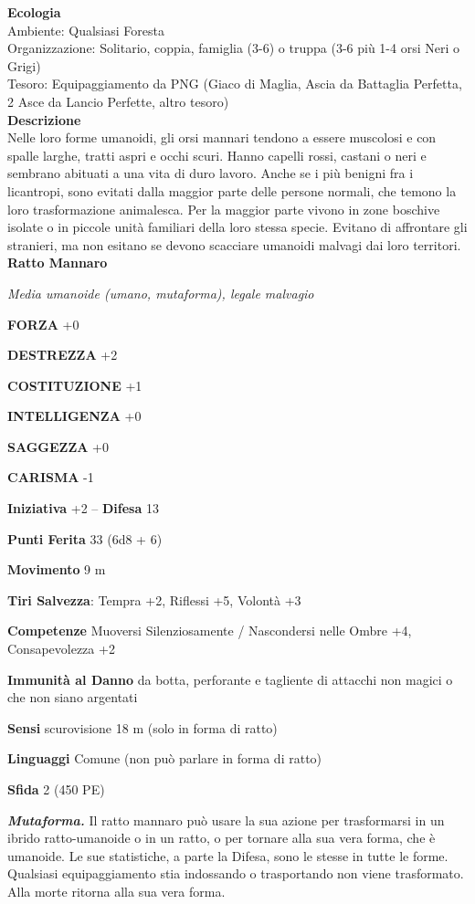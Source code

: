 \begin{multicols}{2}
\textbf{Ecologia}\\
Ambiente: Qualsiasi Foresta\\
Organizzazione: Solitario, coppia, famiglia (3-6) o truppa (3-6 più 1-4 orsi Neri o Grigi)\\
Tesoro: Equipaggiamento da PNG (Giaco di Maglia, Ascia da Battaglia Perfetta, 2 Asce da Lancio Perfette, altro tesoro)\\
\textbf{Descrizione}\\
Nelle loro forme umanoidi, gli orsi mannari tendono a essere muscolosi e con spalle larghe, tratti aspri e occhi scuri. Hanno capelli rossi, castani o neri e sembrano abituati a una vita di duro lavoro. Anche se i più benigni fra i licantropi, sono evitati dalla maggior parte delle persone normali, che temono la loro trasformazione animalesca. Per la maggior parte vivono in zone boschive isolate o in piccole unità familiari della loro stessa specie. Evitano di affrontare gli stranieri, ma non esitano se devono scacciare umanoidi malvagi dai loro territori.\\

\medskip{}\textbf{Ratto Mannaro}

\emph{Media umanoide (umano, mutaforma), legale malvagio}

\textbf{FORZA} +0

\textbf{DESTREZZA} +2

\textbf{COSTITUZIONE} +1

\textbf{INTELLIGENZA} +0

\textbf{SAGGEZZA} +0

\textbf{CARISMA} -1

\textbf{Iniziativa} +2 -- \textbf{Difesa} 13

\textbf{Punti Ferita} 33 (6d8 + 6)

\textbf{Movimento} 9 m

\textbf{Tiri Salvezza}: Tempra +2, Riflessi +5, Volontà +3

\textbf{Competenze} Muoversi Silenziosamente / Nascondersi nelle Ombre +4, Consapevolezza +2

\textbf{Immunità al Danno} da botta, perforante e tagliente di attacchi non magici o che non siano argentati

\textbf{Sensi} scurovisione 18 m (solo in forma di ratto)

\textbf{Linguaggi} Comune (non può parlare in forma di ratto)

\textbf{Sfida} 2 (450 PE)

\emph{\textbf{Mutaforma.}} Il ratto mannaro può usare la sua azione per trasformarsi in un ibrido ratto-umanoide o in un ratto, o per tornare alla sua vera forma, che è umanoide. Le sue statistiche, a parte la Difesa, sono le stesse in tutte le forme. Qualsiasi equipaggiamento stia indossando o trasportando non viene trasformato. Alla morte ritorna alla sua vera forma.


\end{multicols}
